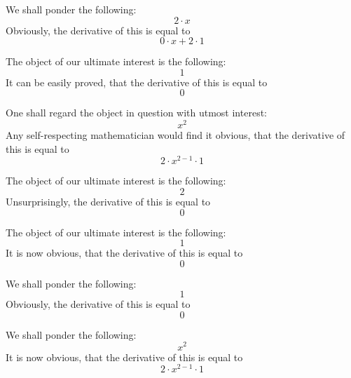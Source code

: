 \documentclass{article}
\begin{document}
We shall ponder the following:
\begin{equation}
2 \cdot x 
\end{equation}
Obviously, the derivative of this is equal to
\begin{equation}
0 \cdot x + 2 \cdot 1 
\end{equation}

The object of our ultimate interest is the following:
\begin{equation}
1 
\end{equation}
It can be easily proved, that the derivative of this is equal to
\begin{equation}
0 
\end{equation}

One shall regard the object in question with utmost interest:
\begin{equation}
x ^{2 } 
\end{equation}
Any self-respecting mathematician would find it obvious, that the derivative of this is equal to
\begin{equation}
2 \cdot x ^{2 - 1 } \cdot 1 
\end{equation}

The object of our ultimate interest is the following:
\begin{equation}
2 
\end{equation}
Unsurprisingly, the derivative of this is equal to
\begin{equation}
0 
\end{equation}

The object of our ultimate interest is the following:
\begin{equation}
1 
\end{equation}
It is now obvious, that the derivative of this is equal to
\begin{equation}
0 
\end{equation}

We shall ponder the following:
\begin{equation}
1 
\end{equation}
Obviously, the derivative of this is equal to
\begin{equation}
0 
\end{equation}

We shall ponder the following:
\begin{equation}
x ^{2 } 
\end{equation}
It is now obvious, that the derivative of this is equal to
\begin{equation}
2 \cdot x ^{2 - 1 } \cdot 1 
\end{equation}
\end{document}
